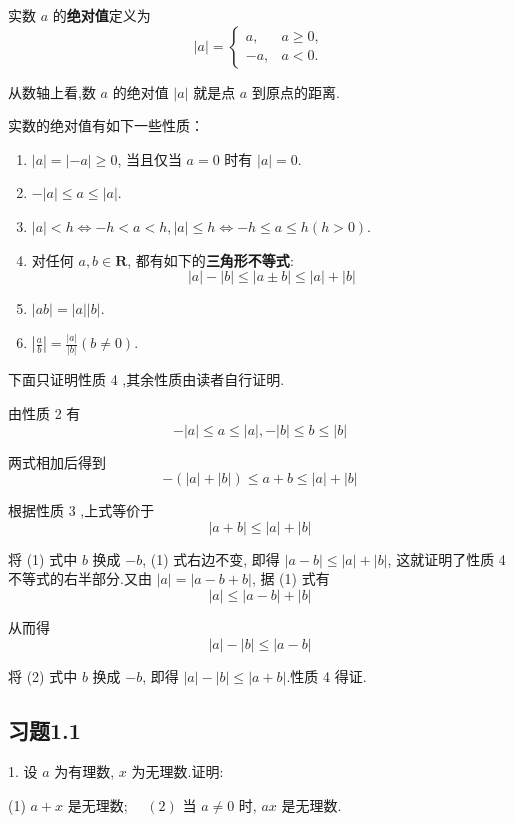 实数 $a$ 的\textbf{绝对值}定义为
\[
|a|=
\begin{cases}
	a, & a \geqslant 0, \\
	-a, & a<0.
\end{cases}
\]

从数轴上看,数 $a$ 的绝对值 $|a|$ 就是点 $a$ 到原点的距离.

实数的绝对值有如下一些性质：

\begin{enumerate}
	\item $|a|=|-a| \geqslant 0$, 当且仅当 $a=0$ 时有 $|a|=0$.

	\item $-|a| \leqslant a \leqslant|a|$.

	\item $|a|<h \Leftrightarrow -h<a<h,|a| \leqslant h \Leftrightarrow -h \leqslant a \leqslant h(h>0)$.

	\item 对任何 $a, b \in \mathbf{R}$, 都有如下的\textbf{三角形不等式}:
	\[
	|a|-|b| \leqslant|a \pm b| \leqslant|a|+|b|
	\]

	\item $|a b|=|a||b|$.

	\item $\left|\frac{a}{b}\right|=\frac{|a|}{|b|}(b \neq 0)$.
\end{enumerate}


下面只证明性质 4 ,其余性质由读者自行证明.

由性质 2 有
\[
-|a| \leqslant a \leqslant|a|,-|b| \leqslant b \leqslant|b|
\]

两式相加后得到
\[
-(|a|+|b|) \leqslant a+b \leqslant|a|+|b|
\]

根据性质 3 ,上式等价于
\[
|a+b| \leqslant|a|+|b| \tag{1}
\]

将 (1) 式中 $b$ 换成 $-b$, (1) 式右边不变, 即得 $|a-b| \leqslant |a|+|b|$, 这就证明了性质 4 不等式的右半部分.又由 $|a|=|a-b+b|$, 据 (1) 式有
\[
|a| \leqslant|a-b|+|b|
\]

从而得
\[
|a|-|b| \leqslant|a-b| \tag{2}
\]

将 (2) 式中 $b$ 换成 $-b$, 即得 $|a|-|b| \leqslant |a+b|$.性质 4 得证.

\subsection{习题1.1}

1. 设 $a$ 为有理数, $x$ 为无理数.证明:

(1) $a+x$ 是无理数; $\quad(2)$ 当 $a \neq 0$ 时, $a x$ 是无理数.

